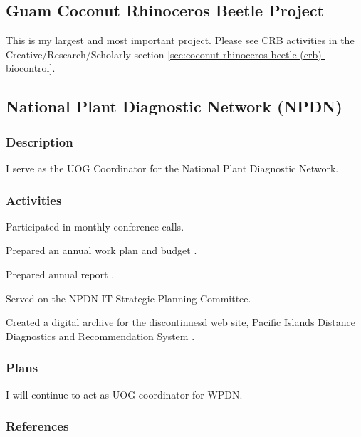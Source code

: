 \subsection{Guam Coconut Rhinoceros Beetle Project}

This is my largest and most important project. Please see CRB activities in the Creative/Research/Scholarly section \ref{sec:coconut-rhinoceros-beetle-(crb)-biocontrol}.

\subsection{National Plant Diagnostic Network (NPDN)}
\begin{refsection}

\subsubsection{Description}	

I serve as the UOG Coordinator for the National Plant Diagnostic Network. 

\subsubsection{Activities}

Participated in monthly conference calls.

Prepared an annual work plan and budget \cite{moore_university_2018}.

Prepared annual report \cite{moore_npdn_2018}.

Served on the NPDN IT Strategic Planning Committee.

Created a digital archive for the discontinuesd web site, Pacific Islands Distance Diagnostics and Recommendation System \cite{moore_piddrs_2019}.

\subsubsection{Plans}

I will continue to act as UOG coordinator for WPDN.

\subsubsection{References}
\printbibliography[heading=none]
\end{refsection}	

